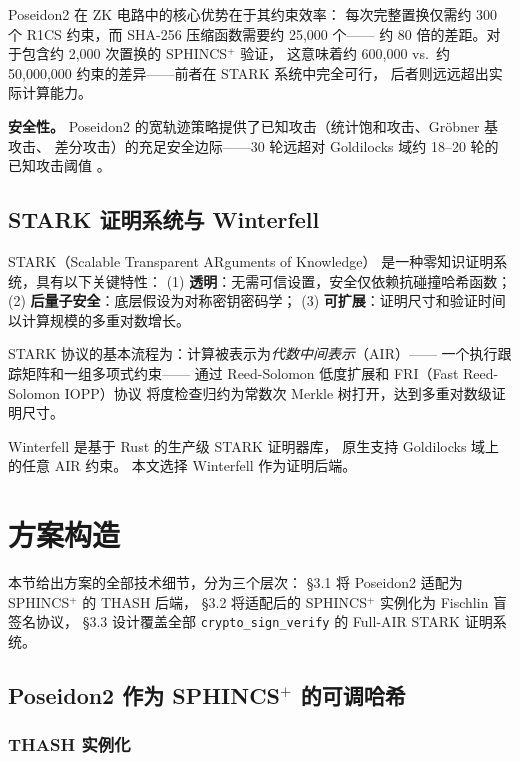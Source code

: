 \documentclass[11pt,a4paper]{ctexart}
\begin{document}
Poseidon2 在 ZK 电路中的核心优势在于其约束效率：
每次完整置换仅需约 300 个 R1CS 约束，而 SHA-256 压缩函数需要约 25,000 个——
约 80 倍的差距。对于包含约 2,000 次置换的 SPHINCS$^+$ 验证，
这意味着约 600,000 vs.\ 约 50,000,000 约束的差异——前者在 STARK 系统中完全可行，
后者则远远超出实际计算能力。

\textbf{安全性。}
Poseidon2 的宽轨迹策略提供了已知攻击（统计饱和攻击、Gr\"obner 基攻击、
差分攻击）的充足安全边际——30 轮远超对 Goldilocks 域约 18--20 轮的已知攻击阈值
\cite{Grassi2023Poseidon2,2021Security}。

\subsection{STARK 证明系统与 Winterfell}

STARK（Scalable Transparent ARguments of Knowledge）
\cite{2019DEEP} 是一种零知识证明系统，具有以下关键特性：
(1) \textbf{透明}：无需可信设置，安全仅依赖抗碰撞哈希函数；
(2) \textbf{后量子安全}：底层假设为对称密钥密码学；
(3) \textbf{可扩展}：证明尺寸和验证时间以计算规模的多重对数增长。

STARK 协议的基本流程为：计算被表示为\emph{代数中间表示}（AIR）——
一个执行跟踪矩阵和一组多项式约束——
通过 Reed-Solomon 低度扩展和 FRI（Fast Reed-Solomon IOPP）协议
将度检查归约为常数次 Merkle 树打开，达到多重对数级证明尺寸。

Winterfell 是基于 Rust 的生产级 STARK 证明器库，
原生支持 Goldilocks 域上的任意 AIR 约束。
本文选择 Winterfell 作为证明后端。

\section{方案构造}

本节给出方案的全部技术细节，分为三个层次：
§3.1 将 Poseidon2 适配为 SPHINCS$^+$ 的 THASH 后端，
§3.2 将适配后的 SPHINCS$^+$ 实例化为 Fischlin 盲签名协议，
§3.3 设计覆盖全部 \texttt{crypto\_sign\_verify} 的 Full-AIR STARK 证明系统。

\subsection{Poseidon2 作为 SPHINCS$^+$ 的可调哈希}

\subsubsection{THASH 实例化}
\end{document}
